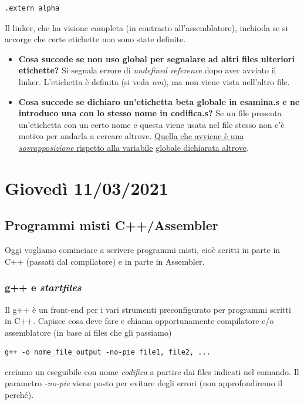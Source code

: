 \documentclass[11pt]{report}
\theoremstyle{definition}
\begin{document}
\begin{itemize}
\begin{verbatim}
.extern alpha
\end{verbatim}
Il linker, che ha visione completa (in contrasto all'assemblatore), inchioda se si accorge che certe etichette non sono state definite.
\begin{itemize}
\item \textbf{Cosa succede se non uso global per segnalare ad altri files ulteriori etichette?} Si segnala errore di \emph{undefined reference} dopo aver avviato il linker. L'etichetta è definita (si veda \emph{nm}), ma non viene vista nell'altro file.
\item \textbf{Cosa succede se dichiaro un'etichetta beta globale in esamina.s e ne introduco una con lo stesso nome in codifica.s?} Se un file presenta un'etichetta con un certo nome e questa viene usata nel file stesso non c'è motivo per andarla a cercare altrove. \underline{Quella che avviene è una \emph{sovrapposizione} rispetto alla variabile} \underline{globale dichiarata altrove}.
\end{itemize}
\end{itemize}

\chapter{Giovedì 11/03/2021}
\section{Programmi misti C++/Assembler}
Oggi vogliamo cominciare a scrivere programmi misti, cioè scritti in parte in C++ (passati dal compilatore) e in parte in Assembler. 

\subsection{g++ e \emph{startfiles}} Il g++ è un front-end per i vari strumenti preconfigurato per programmi scritti in C++. Capisce cosa deve fare e chiama opportunamente compilatore e/o assemblatore (in base ai files che gli passiamo)
\begin{verbatim}
g++ -o nome_file_output -no-pie file1, file2, ...
\end{verbatim}
creiamo un eseguibile con nome \emph{codifica} a partire dai files indicati nel comando. Il parametro \emph{-no-pie} viene posto per evitare degli errori (non approfondiremo il perché).  
\end{document}
